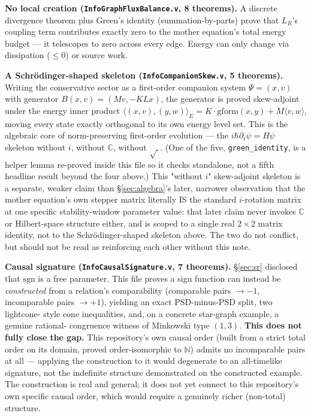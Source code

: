 \documentclass[10pt,twocolumn]{article}
\begin{document}
\textbf{No local creation (\texttt{InfoGraphFluxBalance.v}, 8 theorems).} A discrete
divergence theorem plus Green's identity (summation-by-parts) prove that $L_R$'s
coupling term contributes exactly zero to the mother equation's total energy budget
--- it telescopes to zero across every edge. Energy can only change via dissipation
($\le0$) or source work.

\textbf{A Schr\"odinger-shaped skeleton (\texttt{InfoCompanionSkew.v}, 5 theorems).}
Writing the conservative sector as a first-order companion system $\Psi=(x,v)$ with
generator $B(x,v)=(Mv,-KLx)$, the generator is proved skew-adjoint under the energy
inner product $\langle(x,v),(y,w)\rangle_E = K\cdot\mathrm{gform}(x,y)+M\langle
v,w\rangle$, moving every state exactly orthogonal to its own energy level set. This
is the algebraic core of norm-preserving first-order evolution --- the $i\hbar
\partial_t\psi=H\psi$ skeleton without $i$, without $\mathbb{C}$, without $\sqrt{\ }$.
(One of the five, \texttt{green\_identity}, is a helper lemma re-proved inside this
file so it checks standalone, not a fifth headline result beyond the four above.)
This "without $i$" skew-adjoint skeleton is a separate, weaker claim than
\S\ref{sec:algebra}'s later, narrower observation that the mother equation's
own stepper matrix literally IS the standard $i$-rotation matrix at one
specific stability-window parameter value: that later claim never invokes
$\mathbb{C}$ or Hilbert-space structure either, and is scoped to a single
real $2\times2$ matrix identity, not to the Schr\"odinger-shaped skeleton
above. The two do not conflict, but should not be read as reinforcing each
other without this note.

\textbf{Causal signature (\texttt{InfoCausalSignature.v}, 7 theorems).} \S\ref{sec:sr} disclosed
that $\mathrm{sgn}$ is a free parameter. This file proves a sign function can instead
be \emph{constructed} from a relation's comparability (comparable pairs $\to -1$,
incomparable pairs $\to +1$), yielding an exact PSD-minus-PSD split, two lightcone-
style cone inequalities, and, on a concrete star-graph example, a genuine rational-
congruence witness of Minkowski type $(1,3)$. \textbf{This does not fully close the
gap.} This repository's own causal order (built from a strict total order on its
domain, proved order-isomorphic to $\mathbb{N}$) admits no incomparable pairs at all
--- applying the construction to it would degenerate to an all-timelike signature,
not the indefinite structure demonstrated on the constructed example. The
construction is real and general; it does not yet connect to this repository's own
specific causal order, which would require a genuinely richer (non-total) structure.
\end{document}
